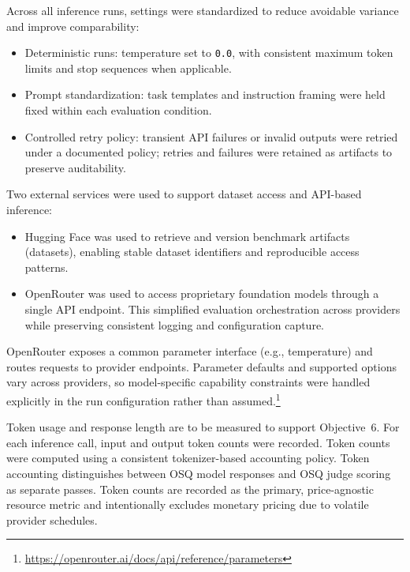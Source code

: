 Across all inference runs, settings were standardized to reduce avoidable variance and improve comparability:

\begin{itemize}
    \item Deterministic runs: temperature set to \texttt{0.0}, with consistent maximum token limits and stop sequences when applicable.
    \item Prompt standardization: task templates and instruction framing were held fixed within each evaluation condition.
    \item Controlled retry policy: transient API failures or invalid outputs were retried under a documented policy; retries and failures were retained as artifacts to preserve auditability.
\end{itemize}

Two external services were used to support dataset access and API-based inference:
\begin{itemize}
    \item Hugging Face was used to retrieve and version benchmark artifacts (datasets), enabling stable dataset identifiers and reproducible access patterns.
    \item OpenRouter was used to access proprietary foundation models through a single API endpoint. This simplified evaluation orchestration across providers while preserving consistent logging and configuration capture.
\end{itemize}

OpenRouter exposes a common parameter interface (e.g., temperature) and routes requests to provider endpoints. Parameter defaults and supported options vary across providers, so model-specific capability constraints were handled explicitly in the run configuration rather than assumed.\footnote{\url{https://openrouter.ai/docs/api/reference/parameters}}

Token usage and response length are to be measured to support Objective~6. For each inference call, input and output token counts were recorded. Token counts were computed using a consistent tokenizer-based accounting policy. Token accounting distinguishes between OSQ model responses and OSQ judge scoring as separate passes. Token counts are recorded as the primary, price-agnostic resource metric and intentionally excludes monetary pricing due to volatile provider schedules.




